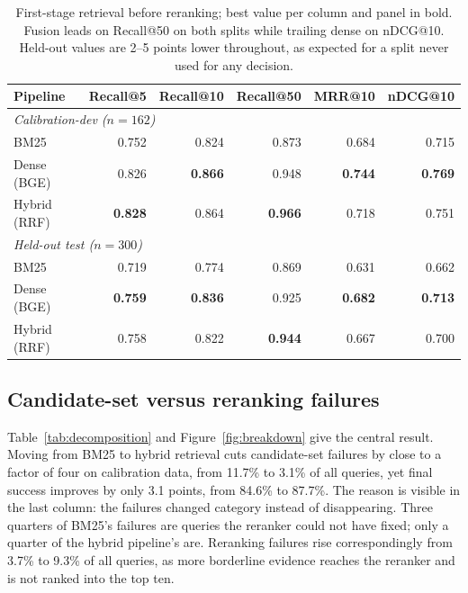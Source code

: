 \documentclass[11pt,a4paper]{article}
\begin{document}
\begin{table}[tbp]
\centering
\small
\caption{First-stage retrieval before reranking; best value per column and panel in bold. Fusion
leads on Recall@50 on both splits while trailing dense on nDCG@10. Held-out values are 2--5
points lower throughout, as expected for a split never used for any decision.}
\label{tab:firststage}
\begin{tabular}{lrrrrr}
\toprule
Pipeline & Recall@5 & Recall@10 & Recall@50 & MRR@10 & nDCG@10 \\
\midrule
\multicolumn{6}{l}{\emph{Calibration-dev ($n = 162$)}} \\
BM25         & 0.752 & 0.824 & 0.873 & 0.684 & 0.715 \\
Dense (BGE)  & 0.826 & \textbf{0.866} & 0.948 & \textbf{0.744} & \textbf{0.769} \\
Hybrid (RRF) & \textbf{0.828} & 0.864 & \textbf{0.966} & 0.718 & 0.751 \\
\midrule
\multicolumn{6}{l}{\emph{Held-out test ($n = 300$)}} \\
BM25         & 0.719 & 0.774 & 0.869 & 0.631 & 0.662 \\
Dense (BGE)  & \textbf{0.759} & \textbf{0.836} & 0.925 & \textbf{0.682} & \textbf{0.713} \\
Hybrid (RRF) & 0.758 & 0.822 & \textbf{0.944} & 0.667 & 0.700 \\
\bottomrule
\end{tabular}
\end{table}

\subsection{Candidate-set versus reranking failures}
\label{sec:decomposition}

Table~\ref{tab:decomposition} and Figure~\ref{fig:breakdown} give the central result. Moving
from BM25 to hybrid retrieval cuts candidate-set failures by close to a factor of four on
calibration data, from 11.7\% to 3.1\% of all queries, yet final success improves by only 3.1
points, from 84.6\% to 87.7\%. The reason is visible in the last column: the failures changed
category instead of disappearing. Three quarters of BM25's failures are queries the reranker
could not have fixed; only a quarter of the hybrid pipeline's are. Reranking failures rise
correspondingly from 3.7\% to 9.3\% of all queries, as more borderline evidence reaches the
reranker and is not ranked into the top ten.
\end{document}

